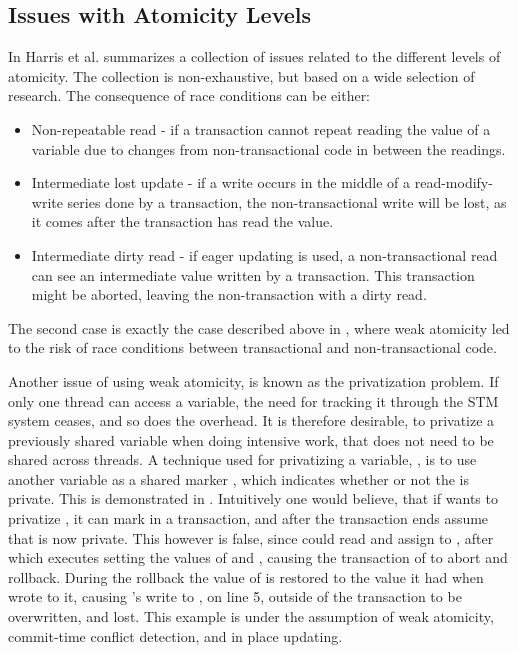 \subsection{Issues with Atomicity Levels}
In \cite[p. 30-35]{harris2010transactional} Harris et al. summarizes a collection of issues related to the different levels of atomicity. The collection is non-exhaustive, but based on a wide selection of research. The consequence of race conditions can be either:
\begin{itemize}
	\item Non-repeatable read - if a transaction cannot repeat reading the value of a variable due to changes from non-transactional code in between the readings.
	\item Intermediate lost update - if a write occurs in the middle of a read-modify-write series done by a transaction, the non-transactional write will be lost, as it comes after the transaction has read the value.
	\item Intermediate dirty read - if eager updating\cite[p. 53]{dpt907e14trending} is used, a non-transactional read can see an intermediate value written by a transaction. This transaction might be aborted, leaving the non-transaction with a dirty read.
\end{itemize}
The second case is exactly the case described above in , where weak atomicity led to the risk of race conditions between transactional and non-transactional code. 

Another issue of using weak atomicity, is known as the privatization problem. If only one thread can access a variable, the need for tracking it through the \ac{STM} system ceases, and so does the overhead. It is therefore desirable, to privatize a previously shared variable when doing intensive work, that does not need to be shared across threads. A technique used for privatizing a variable, , is to use another variable as a shared marker , which indicates whether or not the  is private. This is demonstrated in . Intuitively one would believe, that if  wants to privatize , it can mark  in a transaction, and after the transaction ends assume that  is now private. This however is false, since  could read  and assign to , after which  executes setting the values of  and , causing the transaction of  to abort and rollback. During the rollback the value of  is restored to the value it had when  wrote to it, causing 's write to , on line 5, outside of the transaction to be overwritten, and lost. This example is under the assumption of weak atomicity, commit-time conflict detection, and in place updating\cite[p. 34]{harris2010transactional}. 

